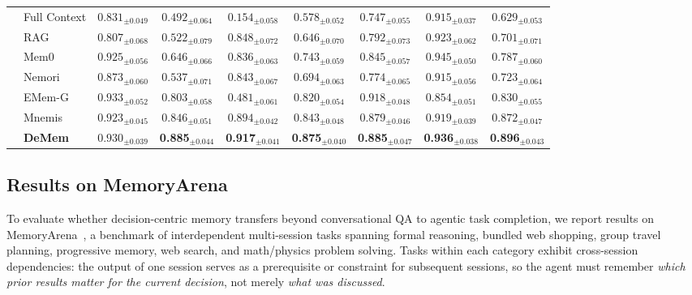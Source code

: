 \documentclass{article}
\theoremstyle{plain}
\theoremstyle{definition}
\theoremstyle{remark}
\begin{document}
\begin{table}[t]
{\begin{tabular}{llccccccc}
 & Full Context & $0.831_{\pm 0.049}$ & $0.492_{\pm 0.064}$ & $0.154_{\pm 0.058}$ & $0.578_{\pm 0.052}$ & $0.747_{\pm 0.055}$ & $0.915_{\pm 0.037}$ & $0.629_{\pm 0.053}$ \\
 & RAG          & $0.807_{\pm 0.068}$ & $0.522_{\pm 0.079}$ & $0.848_{\pm 0.072}$ & $0.646_{\pm 0.070}$ & $0.792_{\pm 0.073}$ & $0.923_{\pm 0.062}$ & $0.701_{\pm 0.071}$ \\
 & Mem0         & $0.925_{\pm 0.056}$ & $0.646_{\pm 0.066}$ & $0.836_{\pm 0.063}$ & $0.743_{\pm 0.059}$ & $0.845_{\pm 0.057}$ & $0.945_{\pm 0.050}$ & $0.787_{\pm 0.060}$ \\
 & Nemori       & $0.873_{\pm 0.060}$ & $0.537_{\pm 0.071}$ & $0.843_{\pm 0.067}$ & $0.694_{\pm 0.063}$ & $0.774_{\pm 0.065}$ & $0.915_{\pm 0.056}$ & $0.723_{\pm 0.064}$ \\
 & EMem-G       & $0.933_{\pm 0.052}$ & $0.803_{\pm 0.058}$ & $0.481_{\pm 0.061}$ & $0.820_{\pm 0.054}$ & $0.918_{\pm 0.048}$ & $0.854_{\pm 0.051}$ & $0.830_{\pm 0.055}$ \\
 & Mnemis       & $0.923_{\pm 0.045}$ & $0.846_{\pm 0.051}$ & $0.894_{\pm 0.042}$ & $0.843_{\pm 0.048}$ & $0.879_{\pm 0.046}$ & $0.919_{\pm 0.039}$ & $0.872_{\pm 0.047}$ \\
 & \textbf{DeMem}
   & $0.930_{\pm 0.039}$
   & \textbf{0.885}$_{\pm 0.044}$
   & \textbf{0.917}$_{\pm 0.041}$
   & \textbf{0.875}$_{\pm 0.040}$
   & \textbf{0.885}$_{\pm 0.047}$
   & \textbf{0.936}$_{\pm 0.038}$
   & \textbf{0.896}$_{\pm 0.043}$ \\
\bottomrule
\end{tabular}%
}
\end{table}


\subsection{Results on MemoryArena}
\label{app:memoryarena}

To evaluate whether decision-centric memory transfers beyond conversational QA to agentic task completion, we report results on MemoryArena~\citep{he2026memoryarenabenchmarkingagentmemory}, a benchmark of interdependent multi-session tasks spanning formal reasoning, bundled web shopping, group travel planning, progressive memory, web search, and math/physics problem solving. Tasks within each category exhibit cross-session dependencies: the output of one session serves as a prerequisite or constraint for subsequent sessions, so the agent must remember \emph{which prior results matter for the current decision}, not merely \emph{what was discussed}.
\end{document}
